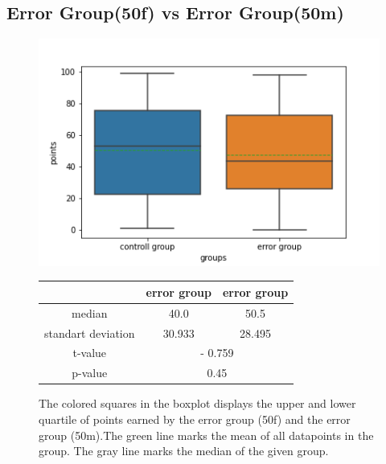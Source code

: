 \documentclass[runningheads]{llncs}
\begin{document}
\subsection{Error Group(50f) vs Error Group(50m)}
\begin{figure}
    \begin{minipage}{0.43\textwidth}        
        \includegraphics[width=\textwidth]{code/generate/all.png}
        \caption{The colored squares in the boxplot displays
        the upper and lower quartile of points earned by the error group (50f) and
        the error group (50m).The green line marks the mean of all datapoints in the group.
        The gray line marks the median  of the given group.} \label{fig6}
    \end{minipage}
\hfill
\begin{minipage}{0.43\textwidth}
\begin{tabular}[]{| c | c | c |}
        \hline
        & error group & error group \\
        \hline
        median & 40.0&50.5 \\
        \hline
        standart deviation & 30.933&28.495 \\
        \hline
        t-value & \multicolumn{2}{c|}{- 0.759} \\
        \hline
        p-value & \multicolumn{2}{c|}{0.45} \\
        \hline            
\end{tabular}
\end{minipage}
\end{figure}
\end{document}
